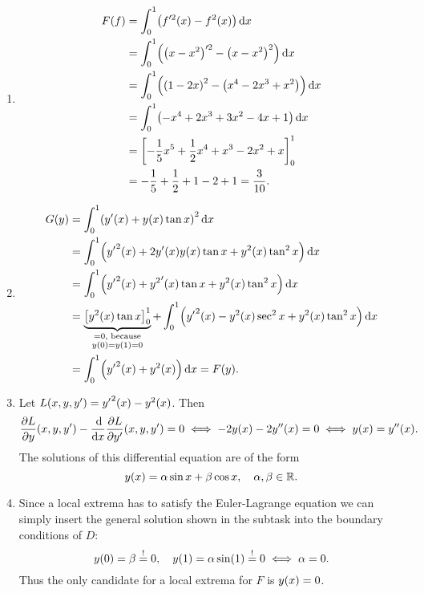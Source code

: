 \documentclass{exercise}
\begin{document}
	\begin{enumerate}
		\item
		\begin{align*}
			F\parentheses*{f} &= \int_0^1 \parentheses*{f'^2\parentheses*{x} - f^2\parentheses*{x}}\d x\\
			&= \int_0^1 \parentheses*{\parentheses*{x - x^2}'^2 - \parentheses*{x - x^2}^2}\d x\\
			&= \int_0^1 \parentheses*{\parentheses*{1 - 2x}^2 - \parentheses*{x^4 - 2x^3 + x^2}}\d x\\
			&= \int_0^1 \parentheses*{-x^4 + 2x^3 + 3x^2 - 4x + 1}\d x\\
			&= \brackets*{-\frac{1}{5}x^5 + \frac{1}{2}x^4 + x^3 - 2x^2 + x}_0^1\\
			&= -\frac{1}{5} + \frac{1}{2} + 1 - 2 + 1 = \frac{3}{10}.
		\end{align*}
		\item
		\begin{align*}
			G\parentheses*{y} &= \int_0^1 \parentheses*{y'\parentheses*{x} + y\parentheses*{x}\tan x}^2 \d x\\
			&= \int_0^1 \parentheses*{{y'}^2\parentheses*{x} + 2y'\parentheses*{x}y\parentheses*{x}\tan x + y^2\parentheses*{x}\tan^2 x}\d x\\
			&= \int_0^1 \parentheses*{{y'}^2\parentheses*{x} + {y^2}'\parentheses*{x}\tan x + y^2\parentheses*{x}\tan^2 x}\d x\\
			&= \underbrace{\brackets*{y^2\parentheses*{x}\tan x}_0^1}_{\substack{= 0\text{, because}\\y\parentheses*{0} = y\parentheses*{1} = 0}} + \int_0^1 \parentheses*{{y'}^2\parentheses*{x} - y^2\parentheses*{x}\sec^2 x + y^2\parentheses*{x}\tan^2 x}\d x\\
			&= \int_0^1 \parentheses*{{y'}^2\parentheses*{x} + y^2\parentheses*{x}}\d x = F\parentheses*{y}.
		\end{align*}
		\item Let \(L\parentheses*{x, y, y'} = {y'}^2\parentheses*{x} - y^2\parentheses*{x}\).
		Then
		\[
			\frac{\partial L}{\partial y}\parentheses*{x, y, y'} - \frac{\d}{\d x}\frac{\partial L}{\partial y'}\parentheses*{x, y, y'} = 0 \iff -2y\parentheses*{x} - 2y''\parentheses*{x} = 0 \iff y\parentheses*{x} = y''\parentheses*{x}.
		\]
		The solutions of this differential equation are of the form
		\[
			y\parentheses*{x} = \alpha\sin x + \beta\cos x, \quad \alpha, \beta \in \R.
		\]
		\item Since a local extrema has to satisfy the Euler-Lagrange equation we can simply insert the general solution shown in the subtask into the boundary conditions of \(D\):
		\[
			y\parentheses*{0} = \beta \stackrel{!}{=} 0, \quad y\parentheses*{1} = \alpha\sin\parentheses*{1} \stackrel{!}{=} 0 \iff \alpha = 0.
		\]
		Thus the only candidate for a local extrema for \(F\) is \(y\parentheses*{x} = 0\).
	\end{enumerate}
\end{document}
